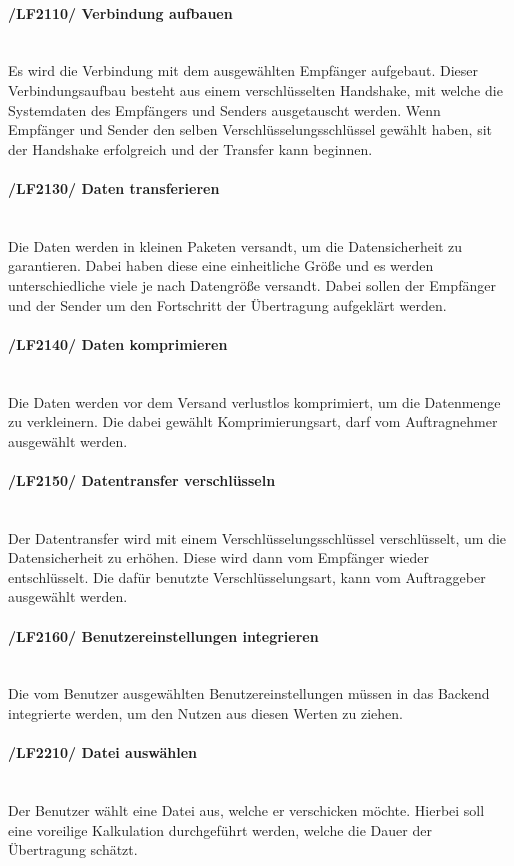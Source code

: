 \begin{indentE}
	\paragraph{/LF2110/ Verbindung aufbauen}\mbox{}\\
	Es wird die Verbindung mit dem ausgewählten Empfänger aufgebaut. Dieser Verbindungsaufbau besteht aus einem verschlüsselten Handshake, mit welche die Systemdaten des Empfängers und Senders ausgetauscht werden. Wenn Empfänger und Sender den selben Verschlüsselungsschlüssel gewählt haben, sit der Handshake erfolgreich und der Transfer kann beginnen.
	\paragraph{/LF2130/ Daten transferieren}\mbox{}\\
	Die Daten werden in kleinen Paketen versandt, um die Datensicherheit zu garantieren. Dabei haben diese eine einheitliche Größe und es werden unterschiedliche viele je nach Datengröße versandt. Dabei sollen der Empfänger und der Sender um den Fortschritt der Übertragung aufgeklärt werden.
	\paragraph{/LF2140/ Daten komprimieren}\mbox{}\\
	Die Daten werden vor dem Versand verlustlos komprimiert, um die Datenmenge zu verkleinern. Die dabei gewählt Komprimierungsart, darf vom Auftragnehmer ausgewählt werden.
	\paragraph{/LF2150/ Datentransfer verschlüsseln}\mbox{}\\
	Der Datentransfer wird mit einem Verschlüsselungsschlüssel verschlüsselt, um die Datensicherheit zu erhöhen. Diese wird dann vom Empfänger wieder entschlüsselt. Die dafür benutzte Verschlüsselungsart, kann vom Auftraggeber ausgewählt werden.
	\paragraph{/LF2160/ Benutzereinstellungen integrieren}\mbox{}\\
	Die vom Benutzer ausgewählten Benutzereinstellungen müssen in das Backend integrierte werden, um den Nutzen aus diesen Werten zu ziehen.
	\paragraph{/LF2210/ Datei auswählen}\mbox{}\\
	Der Benutzer wählt eine Datei aus, welche er verschicken möchte. Hierbei soll eine voreilige Kalkulation durchgeführt werden, welche die Dauer der Übertragung schätzt.

\end{indentE}
